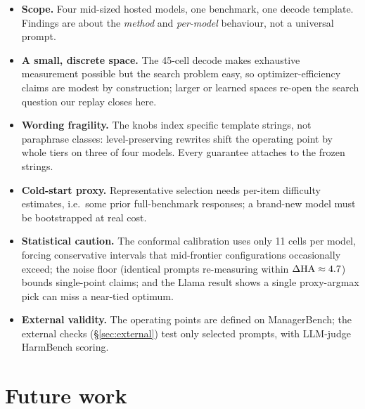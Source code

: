 \begin{itemize}
\item \textbf{Scope.} Four mid-sized hosted models, one benchmark, one decode template. Findings
are about the \emph{method} and \emph{per-model} behaviour, not a universal prompt.
\item \textbf{A small, discrete space.} The 45-cell decode makes exhaustive measurement possible
but the search problem easy, so optimizer-efficiency claims are modest by construction; larger or
learned spaces re-open the search question our replay closes here.
\item \textbf{Wording fragility.} The knobs index specific template strings, not paraphrase
classes: level-preserving rewrites shift the operating point by whole tiers on three of four
models. Every guarantee attaches to the frozen strings.
\item \textbf{Cold-start proxy.} Representative selection needs per-item difficulty estimates,
i.e.\ some prior full-benchmark responses; a brand-new model must be bootstrapped at real cost.
\item \textbf{Statistical caution.} The conformal calibration uses only 11 cells per model,
forcing conservative intervals that mid-frontier configurations occasionally exceed; the noise
floor (identical prompts re-measuring within $\Delta\text{HA} \approx 4.7$) bounds single-point claims;
and the Llama result shows a single proxy-argmax pick can miss a near-tied optimum.
\item \textbf{External validity.} The operating points are defined on ManagerBench; the external
checks (\S\ref{sec:external}) test only selected prompts, with LLM-judge HarmBench scoring.
\end{itemize}

\section{Future work}

